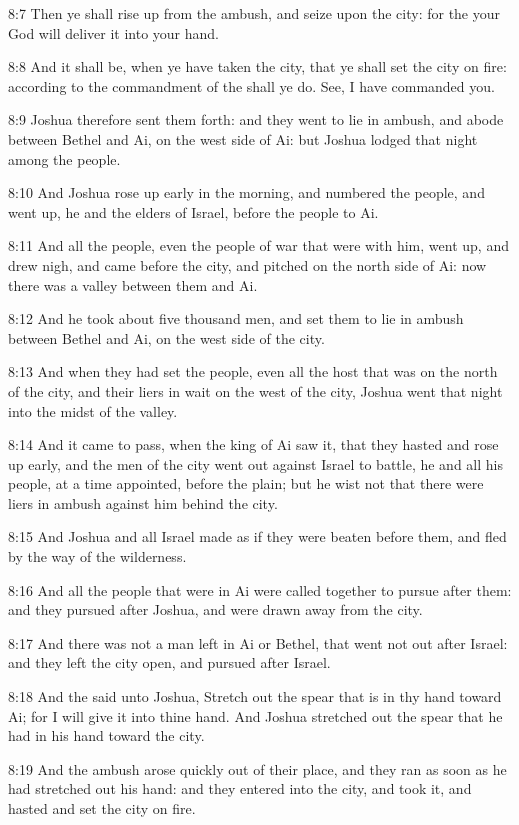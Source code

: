 8:7 Then ye shall rise up from the ambush, and seize upon the city:
for the \LORD your God will deliver it into your hand.

8:8 And it shall be, when ye have taken the city, that ye shall set
the city on fire: according to the commandment of the \LORD shall ye
do. See, I have commanded you.

8:9 Joshua therefore sent them forth: and they went to lie in ambush,
and abode between Bethel and Ai, on the west side of Ai: but Joshua
lodged that night among the people.

8:10 And Joshua rose up early in the morning, and numbered the people,
and went up, he and the elders of Israel, before the people to Ai.

8:11 And all the people, even the people of war that were with him,
went up, and drew nigh, and came before the city, and pitched on the
north side of Ai: now there was a valley between them and Ai.

8:12 And he took about five thousand men, and set them to lie in
ambush between Bethel and Ai, on the west side of the city.

8:13 And when they had set the people, even all the host that was on
the north of the city, and their liers in wait on the west of the
city, Joshua went that night into the midst of the valley.

8:14 And it came to pass, when the king of Ai saw it, that they hasted
and rose up early, and the men of the city went out against Israel to
battle, he and all his people, at a time appointed, before the plain;
but he wist not that there were liers in ambush against him behind the
city.

8:15 And Joshua and all Israel made as if they were beaten before
them, and fled by the way of the wilderness.

8:16 And all the people that were in Ai were called together to pursue
after them: and they pursued after Joshua, and were drawn away from
the city.

8:17 And there was not a man left in Ai or Bethel, that went not out
after Israel: and they left the city open, and pursued after Israel.

8:18 And the \LORD said unto Joshua, Stretch out the spear that is in
thy hand toward Ai; for I will give it into thine hand. And Joshua
stretched out the spear that he had in his hand toward the city.

8:19 And the ambush arose quickly out of their place, and they ran as
soon as he had stretched out his hand: and they entered into the city,
and took it, and hasted and set the city on fire.

